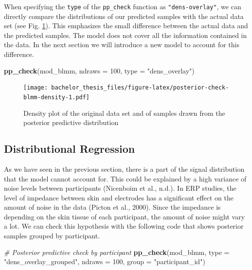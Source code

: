 \documentclass[
  doc,12pt,floatsintext]{apa7}
\newenvironment{Shaded}{\begin{snugshade}}{\end{snugshade}}
\newcommand{\AttributeTok}[1]{\textcolor[rgb]{0.13,0.29,0.53}{#1}}
\newcommand{\CommentTok}[1]{\textcolor[rgb]{0.56,0.35,0.01}{\textit{#1}}}
\newcommand{\DecValTok}[1]{\textcolor[rgb]{0.00,0.00,0.81}{#1}}
\newcommand{\FunctionTok}[1]{\textcolor[rgb]{0.13,0.29,0.53}{\textbf{#1}}}
\newcommand{\NormalTok}[1]{#1}
\newcommand{\StringTok}[1]{\textcolor[rgb]{0.31,0.60,0.02}{#1}}
\begin{document}
When specifying the \texttt{type} of the \texttt{pp\_check} function as \texttt{"dens-overlay"}, we can directly compare the distributions of our predicted samples with the actual data set (see Fig. \ref{fig:posterior-check-blmm-density}). This emphasizes the small difference between the actual data and the predicted samples. The model does not cover all the information contained in the data. In the next section we will introduce a new model to account for this difference.



\begin{Shaded}
\begin{Highlighting}[]
\FunctionTok{pp\_check}\NormalTok{(mod\_blmm, }\AttributeTok{ndraws =} \DecValTok{100}\NormalTok{, }\AttributeTok{type =} \StringTok{"dens\_overlay"}\NormalTok{)}
\end{Highlighting}
\end{Shaded}

\begin{figure}
\centering
\texttt{[image: bachelor\_thesis\_files/figure-latex/posterior-check-blmm-density-1.pdf]}
\caption{\label{fig:posterior-check-blmm-density}Density plot of the original data set and of samples drawn from the posterior predictive distribution}
\end{figure}

\subsection{Distributional Regression}\label{distributional-regression}

As we have seen in the previous section, there is a part of the signal distribution that the model cannot account for. This could be explained by a high variance of noise levels between participants (Nicenboim et al., n.d.). In ERP studies, the level of impedance between skin and electrodes has a significant effect on the amount of noise in the data (Picton et al., 2000). Since the impedance is depending on the skin tissue of each participant, the amount of noise might vary a lot. We can check this hypothesis with the following code that shows posterior samples grouped by participant.



\begin{Shaded}
\begin{Highlighting}[]
\CommentTok{\# Posterior predictive check by participant}
\FunctionTok{pp\_check}\NormalTok{(mod\_blmm, }
         \AttributeTok{type =} \StringTok{"dens\_overlay\_grouped"}\NormalTok{,}
         \AttributeTok{ndraws =} \DecValTok{100}\NormalTok{,}
         \AttributeTok{group =} \StringTok{"participant\_id"}\NormalTok{)}
\end{Highlighting}
\end{Shaded}
\end{document}

